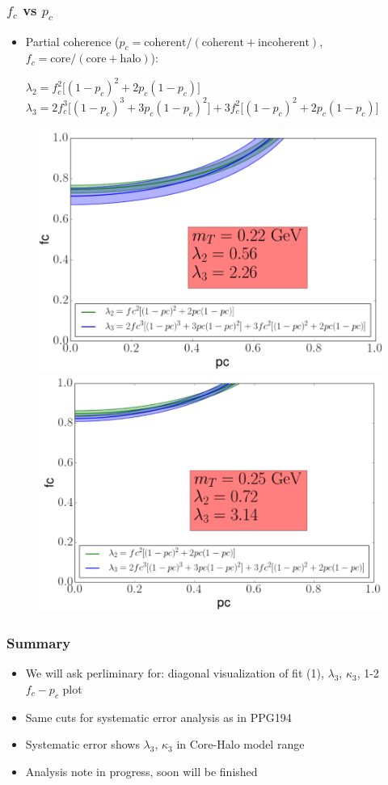 \documentclass{beamer}
\begin{document}
\begin{frame}
\frametitle{$f_c$ vs $p_c$}
\begin{itemize}
\item Partial coherence ($p_c=\mathrm{coherent}/(\mathrm{coherent}+\mathrm{incoherent})$, $f_c=\mathrm{core}/(\mathrm{core}+\mathrm{halo})$):

 
$\lambda_2=f_c^2\big[(1-p_c)^2+2p_c(1-p_c)\big]$
$\lambda_3=2f_c^3\big[(1-p_c)^3+3p_c(1-p_c)^2\big]+3f_c^2\big[(1-p_c)^2+2p_c(1-p_c)\big]$
\end{itemize}
\begin{figure}
\includegraphics[scale=0.3]{pic/fcpc/5}
\includegraphics[scale=0.3]{pic/fcpc/9}
\end{figure}
\end{frame}

\begin{frame}
\frametitle{Summary}
\begin{itemize}
\setlength{\itemsep}{24pt}
\item We will ask perliminary for: diagonal visualization of fit (1), $\lambda_3$, $\kappa_3$, 1-2 $f_c-p_c$ plot
\item Same cuts for systematic error analysis as in PPG194
\item Systematic error shows $\lambda_3$, $\kappa_3$ in Core-Halo model range
\item Analysis note in progress, soon will be finished
\end{itemize}

\end{frame}
\end{document}
